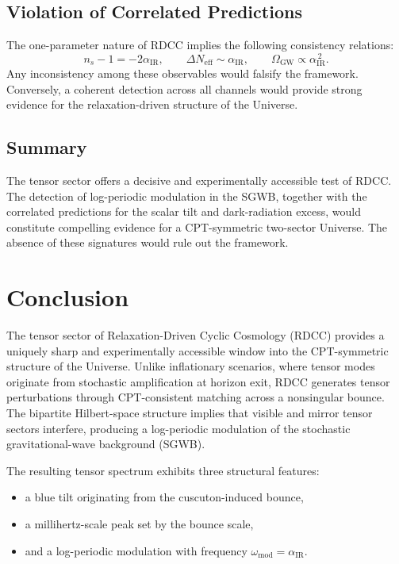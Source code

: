 \documentclass[11pt,a4paper]{article}
\begin{document}
\subsection{Violation of Correlated Predictions}

The one-parameter nature of RDCC implies the following consistency relations:
\begin{equation}
    n_{s} - 1 = -2\alpha_{\mathrm{IR}},
    \qquad
    \Delta N_{\mathrm{eff}} \sim \alpha_{\mathrm{IR}},
    \qquad
    \Omega_{\mathrm{GW}} \propto \alpha_{\mathrm{IR}}^{\,2}.
\end{equation}
Any inconsistency among these observables would falsify the framework. Conversely, a
coherent detection across all channels would provide strong evidence for the relaxation-driven
structure of the Universe.

\subsection{Summary}

The tensor sector offers a decisive and experimentally accessible test of RDCC. The detection
of log-periodic modulation in the SGWB, together with the correlated predictions for the
scalar tilt and dark-radiation excess, would constitute compelling evidence for a CPT-symmetric
two-sector Universe. The absence of these signatures would rule out the framework.

\section{Conclusion}

The tensor sector of Relaxation-Driven Cyclic Cosmology (RDCC) provides a uniquely
sharp and experimentally accessible window into the CPT-symmetric structure of the
Universe. Unlike inflationary scenarios, where tensor modes originate from stochastic
amplification at horizon exit, RDCC generates tensor perturbations through CPT-consistent
matching across a nonsingular bounce. The bipartite Hilbert-space structure implies that
visible and mirror tensor sectors interfere, producing a log-periodic modulation of the
stochastic gravitational-wave background (SGWB).

The resulting tensor spectrum exhibits three structural features:
\begin{itemize}
    \item a blue tilt originating from the cuscuton-induced bounce,
    \item a millihertz-scale peak set by the bounce scale,
    \item and a log-periodic modulation with frequency
    $\omega_{\mathrm{mod}} = \alpha_{\mathrm{IR}}$.
\end{itemize}
\end{document}
